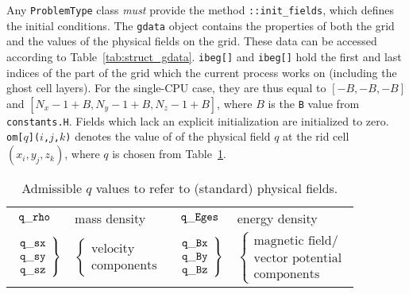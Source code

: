 Any {\tt ProblemType} class {\em must} provide the method
{\tt ::init\_fields}, which defines the initial conditions. The
{\tt gdata} object contains the properties of both the grid and the
values of the physical fields on the grid. These data can be accessed
according to Table~\ref{tab:struct_gdata}.
{\tt ibeg[]} and {\tt ibeg[]} hold the first and last indices of the
part of the grid which the current process works on (including the
ghost cell layers). For the single-CPU case, they are thus equal to
$[-B,-B,-B]$ and $[N_x-1+B, N_y-1+B, N_z-1+B]$, where $B$ is the {\tt B}
value from {\tt constants.H}. Fields which lack an explicit
initialization are initialized to zero.\\
{\tt om[$q$]($i$,$j$,$k$)} denotes the value of of the physical field $q$
at the rid cell $(x_i,y_j,z_k)$, where $q$ is chosen from
Table~\ref{tab:qvals}.
\begin{table}
  \begin{center}
    \begin{tabular}{ll|ll}
      $ \begin{array}{l} {\tt q\_rho}  \end{array}$ &   mass density &
      $ \begin{array}{l} {\tt q\_Eges} \end{array}$ & energy density \\
      $ \left. \begin{array}{l} 
          {\tt q\_sx} \\ {\tt q\_sy} \\ {\tt q\_sz}
        \end{array} \right\}$ &
      $ \left\{ \begin{array}{l}
        \mbox{velocity} \\ \mbox{components}
      \end{array} \right. $ &
      $ \left. \begin{array}{l} 
          {\tt q\_Bx} \\ {\tt q\_By} \\ {\tt q\_Bz}
        \end{array} \right\}$ &
   $ \left\{ \begin{array}{l} 
     \mbox{magnetic field/} \\  \mbox{vector potential} \\
     \mbox{components}
      \end{array} \right. $
    \end{tabular}
    \caption{\label{tab:qvals}
      Admissible $q$ values to refer to (standard) physical fields.
    }
  \end{center}
\end{table}
